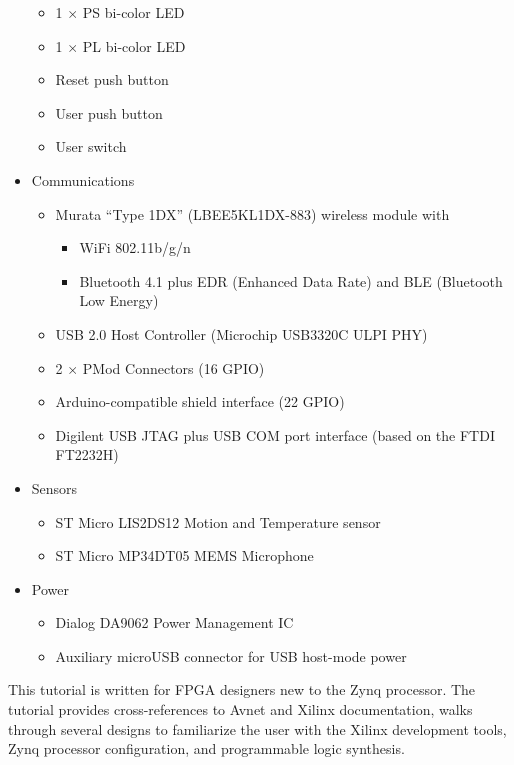 \begin{itemize}
\begin{itemize}
\item 1 $\times$ PS bi-color LED
\item 1 $\times$ PL bi-color LED
\item Reset push button
\item User push button
\item User switch
\end{itemize}
%
\item Communications
%
\begin{itemize}
\item Murata ``Type 1DX'' (LBEE5KL1DX-883) wireless module with
\begin{itemize}
\item WiFi 802.11b/g/n
\item Bluetooth 4.1 plus EDR (Enhanced Data Rate) and BLE (Bluetooth Low Energy)
\end{itemize}
\item USB 2.0 Host Controller (Microchip USB3320C ULPI PHY)
\item 2 $\times$ PMod Connectors (16 GPIO)
\item Arduino-compatible shield interface (22 GPIO)
\item Digilent USB JTAG plus USB COM port interface (based on the FTDI FT2232H)
\end{itemize}
%
\item Sensors
%
\begin{itemize}
\item ST Micro LIS2DS12 Motion and Temperature sensor
\item ST Micro MP34DT05 MEMS Microphone
\end{itemize}
%
\item Power
%
\begin{itemize}
\item Dialog DA9062 Power Management IC
\item Auxiliary microUSB connector for USB host-mode power
\end{itemize}
%
\end{itemize}
%
This tutorial is written for FPGA designers new to the Zynq processor. The
tutorial provides cross-references to Avnet and Xilinx documentation, walks
through several designs to familiarize the user with the Xilinx development tools,
Zynq processor configuration, and programmable logic synthesis.

